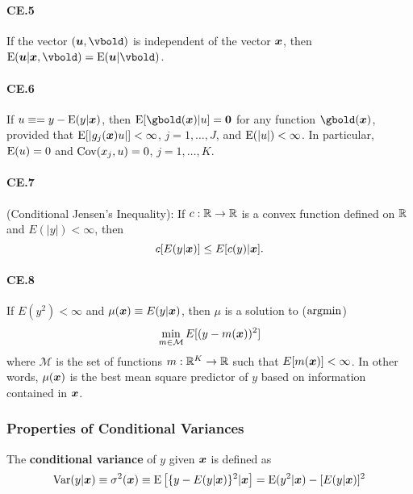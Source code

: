 \documentclass[11pt, oneside, a4paper, article]{article}
\numberwithin{equation}{section}
\begin{document}
\paragraph{CE.5}
If the vector $(\ubold, \vbold)$ is independent of the vector $\boldsymbol{x}$, then
$\E(\ubold | \xvec, \vbold) = \E(\ubold | \vbold)$.

\paragraph{CE.6} 
If $u \equiv = y - \text{E}(y | \boldsymbol{x})$, then
$\E[\gbold(\xvec) | u] = \mbs{0}$ for any function $\gbold(\xvec)$, provided that
$\text{E}[ | g_{j}(\boldsymbol{x})u | ] < \infty$, $j = 1, \dots, J$, 
and $\text{E}(|u|) < \infty$.
In particular, $\text{E}(u) = 0$ and $\text{Cov}( x_{j}, u ) = 0$, $j = 1, \dots, K$.

\paragraph{CE.7}(Conditional Jensen's Inequality):
If $c : \mathbb{R} \to \mathbb{R}$ is a convex function defined on $\mathbb{R}$ and $E(|y|) < \infty$, then
\begin{equation*}
	c[E(y | \boldsymbol{x})] \leq E[c(y) | \boldsymbol{x}].
\end{equation*}

\paragraph{CE.8}
If $E(y^{2}) < \infty$ and $\mu(\boldsymbol{x}) \equiv E(y | \boldsymbol{x})$, then $\mu$ is a solution to ($\operatorname*{\arg\!\min}$)
\begin{equation*}
	\min_{m \in \mathcal{M}}
	E[ ( y - m(\boldsymbol{x}) )^{2} ]
\end{equation*}
where $\mathcal{M}$ is the set of functions $m: \mathbb{R}^{K} \to \mathbb{R}$ such that $E[m(\boldsymbol{x})] < \infty$.
In other words, $\mu(\boldsymbol{x})$ is the best mean square predictor of $y$ based on information contained in $\boldsymbol{x}$.

\clearpage
\subsubsection{Properties of Conditional Variances}

The \textbf{conditional variance} of $y$ given $\boldsymbol{x}$ is defined as
\begin{equation*}
\text{Var}(y | \boldsymbol{x}) \equiv \sigma^2(\boldsymbol{x}) \equiv
\text{E} \left[ \{ y - E(y | \boldsymbol{x}) \}^{2} | \boldsymbol{x}\right]
=
\text{E}( y^{2} | \boldsymbol{x} ) - [E(y | \boldsymbol{x})]^{2} 
\end{equation*}
\end{document}
